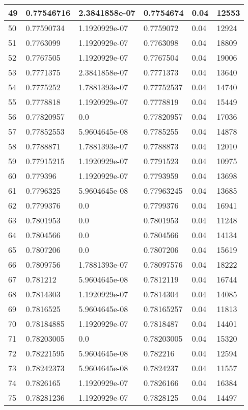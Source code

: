 \begin{longtable}{|l|l|l|l|l|l|}
49 & 0.77546716 & 2.3841858e-07 & 0.7754674 & 0.04 & 12553 \\ \hline 
50 & 0.77590734 & 1.1920929e-07 & 0.7759072 & 0.04 & 12924 \\ \hline 
51 & 0.7763099 & 1.1920929e-07 & 0.7763098 & 0.04 & 18809 \\ \hline 
52 & 0.7767505 & 1.1920929e-07 & 0.7767504 & 0.04 & 19006 \\ \hline 
53 & 0.7771375 & 2.3841858e-07 & 0.7771373 & 0.04 & 13640 \\ \hline 
54 & 0.7775252 & 1.7881393e-07 & 0.77752537 & 0.04 & 14740 \\ \hline 
55 & 0.7778818 & 1.1920929e-07 & 0.7778819 & 0.04 & 15449 \\ \hline 
56 & 0.77820957 & 0.0 & 0.77820957 & 0.04 & 17036 \\ \hline 
57 & 0.77852553 & 5.9604645e-08 & 0.7785255 & 0.04 & 14878 \\ \hline 
58 & 0.7788871 & 1.7881393e-07 & 0.7788873 & 0.04 & 12010 \\ \hline 
59 & 0.77915215 & 1.1920929e-07 & 0.7791523 & 0.04 & 10975 \\ \hline 
60 & 0.779396 & 1.1920929e-07 & 0.7793959 & 0.04 & 13698 \\ \hline 
61 & 0.7796325 & 5.9604645e-08 & 0.77963245 & 0.04 & 13685 \\ \hline 
62 & 0.7799376 & 0.0 & 0.7799376 & 0.04 & 16941 \\ \hline 
63 & 0.7801953 & 0.0 & 0.7801953 & 0.04 & 11248 \\ \hline 
64 & 0.7804566 & 0.0 & 0.7804566 & 0.04 & 14134 \\ \hline 
65 & 0.7807206 & 0.0 & 0.7807206 & 0.04 & 15619 \\ \hline 
66 & 0.7809756 & 1.7881393e-07 & 0.78097576 & 0.04 & 18222 \\ \hline 
67 & 0.781212 & 5.9604645e-08 & 0.7812119 & 0.04 & 16744 \\ \hline 
68 & 0.7814303 & 1.1920929e-07 & 0.7814304 & 0.04 & 14085 \\ \hline 
69 & 0.7816525 & 5.9604645e-08 & 0.78165257 & 0.04 & 11813 \\ \hline 
70 & 0.78184885 & 1.1920929e-07 & 0.7818487 & 0.04 & 14401 \\ \hline 
71 & 0.78203005 & 0.0 & 0.78203005 & 0.04 & 15320 \\ \hline 
72 & 0.78221595 & 5.9604645e-08 & 0.782216 & 0.04 & 12594 \\ \hline 
73 & 0.78242373 & 5.9604645e-08 & 0.7824237 & 0.04 & 11557 \\ \hline 
74 & 0.7826165 & 1.1920929e-07 & 0.7826166 & 0.04 & 16384 \\ \hline 
75 & 0.78281236 & 1.1920929e-07 & 0.7828125 & 0.04 & 14497 \\ \hline 
\end{longtable}